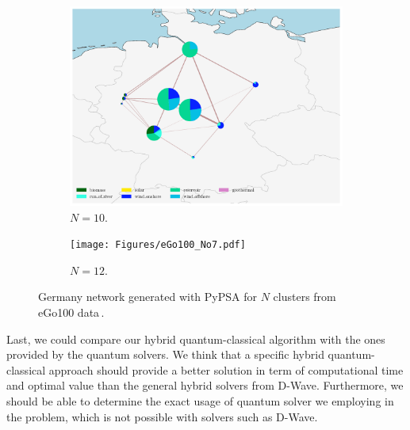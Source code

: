 \begin{figure}[H]
\begin{subfigure}[c]{0.5\linewidth}
\includegraphics[width=\linewidth]{Figures/eGo100_No6.pdf}
\caption{$N=10$.}
\label{fig:3c}
\end{subfigure}\hfill    
\begin{subfigure}[c]{0.5\linewidth}
\texttt{[image: Figures/eGo100\_No7.pdf]}
\caption{$N=12$.}
\label{fig:3d}
\end{subfigure}
    
\caption{Germany network generated with PyPSA for $N$ clusters from eGo100 data\,\cite{Mueller2018}.}
\label{fig:GeneralNetworks}
\end{figure}
Last, we could compare our hybrid quantum-classical algorithm with the ones provided by the quantum solvers. We think that a specific hybrid quantum-classical approach should provide a better solution in term of computational time and optimal value than the general hybrid solvers from D-Wave. Furthermore, we should be able to determine the exact usage of quantum solver we employing in the problem, which is not possible with solvers such as D-Wave.